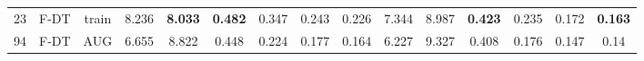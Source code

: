 \begin{table}
\begin{tabular}{@{\hskip3pt}c@{\hskip3pt}c@{\hskip3pt}c@{\hskip3pt}c@{\hskip3pt}c@{\hskip3pt}c@{\hskip3pt}c@{\hskip3pt}c@{\hskip3pt}c@{\hskip3pt}c@{\hskip3pt}c@{\hskip3pt}c@{\hskip3pt}c@{\hskip3pt}c@{\hskip3pt}c}
         23 &           F-DT &                     train &             8.236 &  \textbf{8.033} &  \textbf{0.482} &           0.347 &          0.243 &           0.226 &               7.344 &           8.987 &  \textbf{0.423} &           0.235 &           0.172 &  \textbf{0.163} \\
         94 &           F-DT &                       AUG &             6.655 &           8.822 &           0.448 &           0.224 &          0.177 &           0.164 &               6.227 &           9.327 &           0.408 &           0.176 &           0.147 &            0.14 \\
\bottomrule
\end{tabular}
\end{table}
